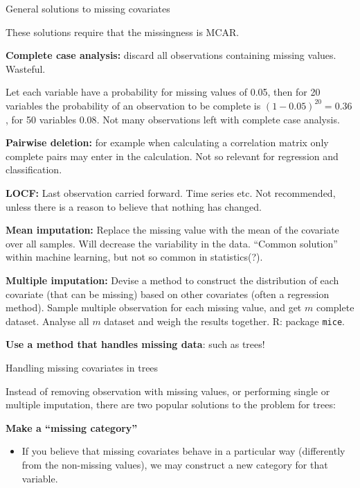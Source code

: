 \documentclass[
  ignorenonframetext,
]{beamer}
\providecommand{\tightlist}{%
  \setlength{\itemsep}{0pt}\setlength{\parskip}{0pt}}
\begin{document}
\begin{frame}

\begin{block}{General solutions to missing covariates}

These solutions require that the missingness is MCAR.

\textbf{Complete case analysis:} discard all observations containing
missing values. Wasteful.

Let each variable have a probability for missing values of 0.05, then
for 20 variables the probability of an observation to be complete is
\((1 − 0.05)^20 = 0.36\), for 50 variables \(0.08\). Not many
observations left with complete case analysis.

\textbf{Pairwise deletion:} for example when calculating a correlation
matrix only complete pairs may enter in the calculation. Not so relevant
for regression and classification.

\textbf{LOCF:} Last observation carried forward. Time series etc. Not
recommended, unless there is a reason to believe that nothing has
changed.

\end{block}

\end{frame}

\begin{frame}[fragile]

\textbf{Mean imputation:} Replace the missing value with the mean of the
covariate over all samples. Will decrease the variability in the data.
``Common solution'' within machine learning, but not so common in
statistics(?).

\textbf{Multiple imputation:} Devise a method to construct the
distribution of each covariate (that can be missing) based on other
covariates (often a regression method). Sample multiple observation for
each missing value, and get \(m\) complete dataset. Analyse all \(m\)
dataset and weigh the results together. R: package \texttt{mice}.

\textbf{Use a method that handles missing data}: such as trees!

\end{frame}

\begin{frame}

\begin{block}{Handling missing covariates in trees}

Instead of removing observation with missing values, or performing
single or multiple imputation, there are two popular solutions to the
problem for trees:

\textbf{Make a ``missing category''}

\begin{itemize}
\tightlist
\item
  If you believe that missing covariates behave in a particular way
  (differently from the non-missing values), we may construct a new
  category for that variable.
\end{itemize}

\end{block}

\end{frame}
\end{document}
